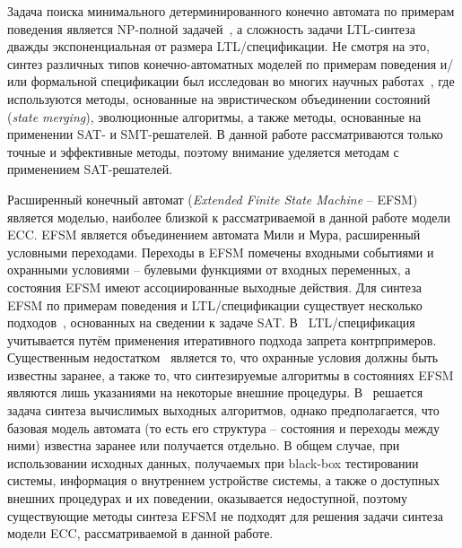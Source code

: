 
Задача поиска минимального детерминированного конечно автомата по примерам поведения является NP-полной задачей~\cite{gold}, а сложность задачи LTL-синтеза дважды экспоненциальная от размера LTL\-/спецификации.
Не смотря на это, синтез различных типов конечно-автоматных моделей по примерам поведения и/или формальной спецификации был исследован во многих научных работах~\cite{heule2010,efsm-tools,zakirzyanov2019,buzhinsky-tii,bosy,tsarev-egorov-gecco,giantamidis-tripakis,petrenko,petrenko2,neider,g4ltl-st,smetsers-lata}, где используются методы, основанные на эвристическом объединении состояний (\textit{state merging}), эволюционные алгоритмы, а также методы, основанные на применении SAT- и SMT-решателей.
В данной работе рассматриваются только точные и эффективные методы, поэтому внимание уделяется методам с применением SAT-решателей.

Расширенный конечный автомат (\textit{Extended Finite State Machine} \--- EFSM) является моделью, наиболее близкой к рассматриваемой в данной работе модели ECC\@. EFSM является объединением автомата Мили и Мура, расширенный условными переходами. Переходы в EFSM помечены входными событиями и охранными условиями \--- булевыми функциями от входных переменных, а состояния EFSM имеют ассоциированные выходные действия.
Для синтеза EFSM по примерам поведения и LTL\-/спецификации существует несколько подходов~\cite{efsm-tools,walkinshaw}, основанных на сведении к задаче SAT. В~\cite{efsm-tools} LTL\-/спецификация учитывается путём применения итеративного подхода запрета контрпримеров.
Существенным недостатком~\cite{efsm-tools} является то, что охранные условия должны быть известны заранее, а также то, что синтезируемые алгоритмы в состояниях EFSM являются лишь указаниями на некоторые внешние процедуры.
В~\cite{walkinshaw} решается задача синтеза вычислимых выходных алгоритмов, однако предполагается, что базовая модель автомата (то есть его структура \--- состояния и переходы между ними) известна заранее или получается отдельно.
В общем случае, при использовании исходных данных, получаемых при black-box тестировании системы, информация о внутреннем устройстве системы, а также о доступных внешних процедурах и их поведении, оказывается недоступной, поэтому существующие методы синтеза EFSM не подходят для решения задачи синтеза модели ECC, рассматриваемой в данной работе.

